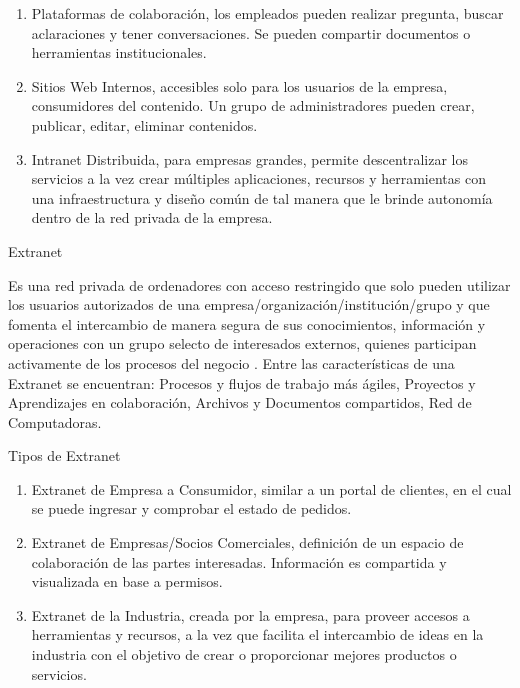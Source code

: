 \documentclass[a4paper,12pt]{article}
\begin{document}
\begin{enumerate} 
\item Plataformas de colaboración, los empleados pueden realizar pregunta, buscar 
aclaraciones y tener conversaciones. Se pueden compartir documentos o herramientas 
institucionales.\\
\item Sitios Web Internos, accesibles solo para los usuarios de la empresa, consumidores
del contenido. Un grupo de administradores pueden crear, publicar, editar, 
eliminar contenidos.\\ 
\item Intranet Distribuida, para empresas grandes, permite descentralizar los servicios 
a la vez crear múltiples aplicaciones, recursos y herramientas con una 
infraestructura y diseño común de tal manera que le brinde autonomía dentro de la 
red privada de la empresa.\\
\end{enumerate}
\break 
\begin{bf}
Extranet\\
\end{bf}
\break
Es una red privada de ordenadores con acceso restringido que solo pueden utilizar 
los usuarios autorizados de una empresa/organización/institución/grupo y que 
fomenta el intercambio de manera segura de sus conocimientos, información y 
operaciones con un grupo selecto de interesados externos, quienes participan 
activamente de los procesos del negocio \cite{Cabello2014}. 
Entre las características de una Extranet se encuentran: Procesos y flujos de 
trabajo más ágiles, Proyectos y Aprendizajes en colaboración, Archivos y Documentos 
compartidos, Red de Computadoras.\\ 
\break
\begin{bf}  
Tipos de Extranet\\
\end{bf}
\break
\begin{enumerate}    
\item Extranet de Empresa a Consumidor, similar a un portal de clientes, en el cual se 
puede ingresar y comprobar el estado de pedidos. 
\item Extranet de Empresas/Socios Comerciales, definición de un espacio de colaboración 
de las partes interesadas. Información es compartida y visualizada en base a 
permisos.
\item Extranet de la Industria, creada por la empresa, para proveer accesos a herramientas 
y recursos, a la vez que facilita el intercambio de ideas en la industria con el objetivo de crear o proporcionar mejores productos o servicios.\\ 
\end{enumerate}


\end{document}
